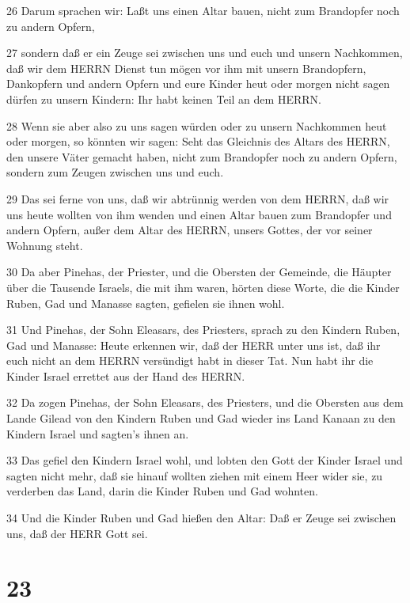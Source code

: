 \par 26 Darum sprachen wir: Laßt uns einen Altar bauen, nicht zum Brandopfer noch zu andern Opfern,
\par 27 sondern daß er ein Zeuge sei zwischen uns und euch und unsern Nachkommen, daß wir dem HERRN Dienst tun mögen vor ihm mit unsern Brandopfern, Dankopfern und andern Opfern und eure Kinder heut oder morgen nicht sagen dürfen zu unsern Kindern: Ihr habt keinen Teil an dem HERRN.
\par 28 Wenn sie aber also zu uns sagen würden oder zu unsern Nachkommen heut oder morgen, so könnten wir sagen: Seht das Gleichnis des Altars des HERRN, den unsere Väter gemacht haben, nicht zum Brandopfer noch zu andern Opfern, sondern zum Zeugen zwischen uns und euch.
\par 29 Das sei ferne von uns, daß wir abtrünnig werden von dem HERRN, daß wir uns heute wollten von ihm wenden und einen Altar bauen zum Brandopfer und andern Opfern, außer dem Altar des HERRN, unsers Gottes, der vor seiner Wohnung steht.
\par 30 Da aber Pinehas, der Priester, und die Obersten der Gemeinde, die Häupter über die Tausende Israels, die mit ihm waren, hörten diese Worte, die die Kinder Ruben, Gad und Manasse sagten, gefielen sie ihnen wohl.
\par 31 Und Pinehas, der Sohn Eleasars, des Priesters, sprach zu den Kindern Ruben, Gad und Manasse: Heute erkennen wir, daß der HERR unter uns ist, daß ihr euch nicht an dem HERRN versündigt habt in dieser Tat. Nun habt ihr die Kinder Israel errettet aus der Hand des HERRN.
\par 32 Da zogen Pinehas, der Sohn Eleasars, des Priesters, und die Obersten aus dem Lande Gilead von den Kindern Ruben und Gad wieder ins Land Kanaan zu den Kindern Israel und sagten's ihnen an.
\par 33 Das gefiel den Kindern Israel wohl, und lobten den Gott der Kinder Israel und sagten nicht mehr, daß sie hinauf wollten ziehen mit einem Heer wider sie, zu verderben das Land, darin die Kinder Ruben und Gad wohnten.
\par 34 Und die Kinder Ruben und Gad hießen den Altar: Daß er Zeuge sei zwischen uns, daß der HERR Gott sei.

\chapter{23}

